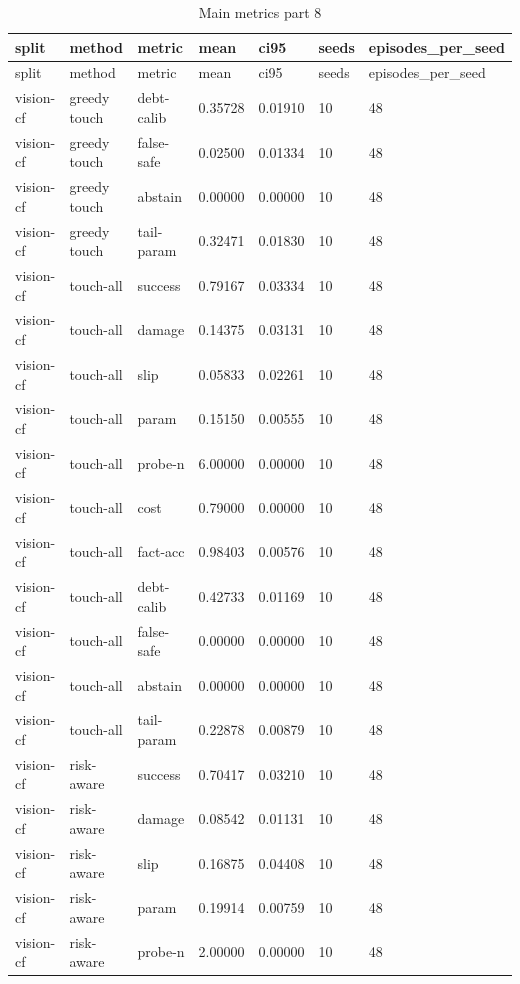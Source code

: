 \documentclass{article}
\begin{document}
\begin{center}
\tiny
\renewcommand{\arraystretch}{0.92}
\setlength{\tabcolsep}{3pt}
\begin{longtable}{lllllll}
\caption{Main metrics part 8}\label{tab:main-metrics-8}\\
\toprule
split & method & metric & mean & ci95 & seeds & episodes\_per\_seed \\
\midrule
\endfirsthead
\toprule
split & method & metric & mean & ci95 & seeds & episodes\_per\_seed \\
\midrule
\endhead
vision-cf & greedy touch & debt-calib & 0.35728 & 0.01910 & 10 & 48 \\
vision-cf & greedy touch & false-safe & 0.02500 & 0.01334 & 10 & 48 \\
vision-cf & greedy touch & abstain & 0.00000 & 0.00000 & 10 & 48 \\
vision-cf & greedy touch & tail-param & 0.32471 & 0.01830 & 10 & 48 \\
vision-cf & touch-all & success & 0.79167 & 0.03334 & 10 & 48 \\
vision-cf & touch-all & damage & 0.14375 & 0.03131 & 10 & 48 \\
vision-cf & touch-all & slip & 0.05833 & 0.02261 & 10 & 48 \\
vision-cf & touch-all & param & 0.15150 & 0.00555 & 10 & 48 \\
vision-cf & touch-all & probe-n & 6.00000 & 0.00000 & 10 & 48 \\
vision-cf & touch-all & cost & 0.79000 & 0.00000 & 10 & 48 \\
vision-cf & touch-all & fact-acc & 0.98403 & 0.00576 & 10 & 48 \\
vision-cf & touch-all & debt-calib & 0.42733 & 0.01169 & 10 & 48 \\
vision-cf & touch-all & false-safe & 0.00000 & 0.00000 & 10 & 48 \\
vision-cf & touch-all & abstain & 0.00000 & 0.00000 & 10 & 48 \\
vision-cf & touch-all & tail-param & 0.22878 & 0.00879 & 10 & 48 \\
vision-cf & risk-aware & success & 0.70417 & 0.03210 & 10 & 48 \\
vision-cf & risk-aware & damage & 0.08542 & 0.01131 & 10 & 48 \\
vision-cf & risk-aware & slip & 0.16875 & 0.04408 & 10 & 48 \\
vision-cf & risk-aware & param & 0.19914 & 0.00759 & 10 & 48 \\
vision-cf & risk-aware & probe-n & 2.00000 & 0.00000 & 10 & 48 \\

\end{longtable}
\end{center}
\end{document}

